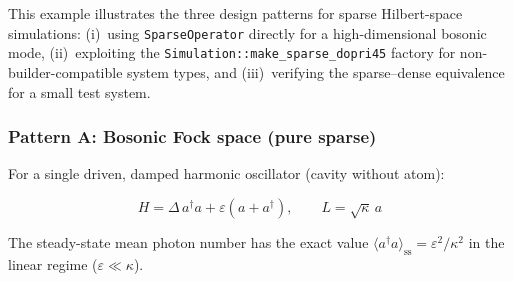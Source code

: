 \documentclass[11pt,a4paper,twoside]{book}
\newcommand{\code}[1]{\texttt{\small#1}}
\theoremstyle{definition}
\theoremstyle{remark}
\begin{document}
This example illustrates the three design patterns for sparse
Hilbert-space simulations: (i)~using \code{SparseOperator} directly
for a high-dimensional bosonic mode, (ii)~exploiting the
\code{Simulation::make\_sparse\_dopri45} factory for non-builder-compatible
system types, and (iii)~verifying the sparse--dense equivalence
for a small test system.

\subsubsection*{Pattern A: Bosonic Fock space (pure sparse)}

For a single driven, damped harmonic oscillator (cavity without atom):

\begin{equation}
  H = \Delta\,a^\dagger a + \varepsilon(a + a^\dagger),
  \qquad
  L = \sqrt{\kappa}\,a
  \label{eq:harmonic-osc}
\end{equation}

The steady-state mean photon number has the exact value
$\langle a^\dagger a\rangle_{\mathrm{ss}} = \varepsilon^2/\kappa^2$
in the linear regime ($\varepsilon \ll \kappa$).
\end{document}
